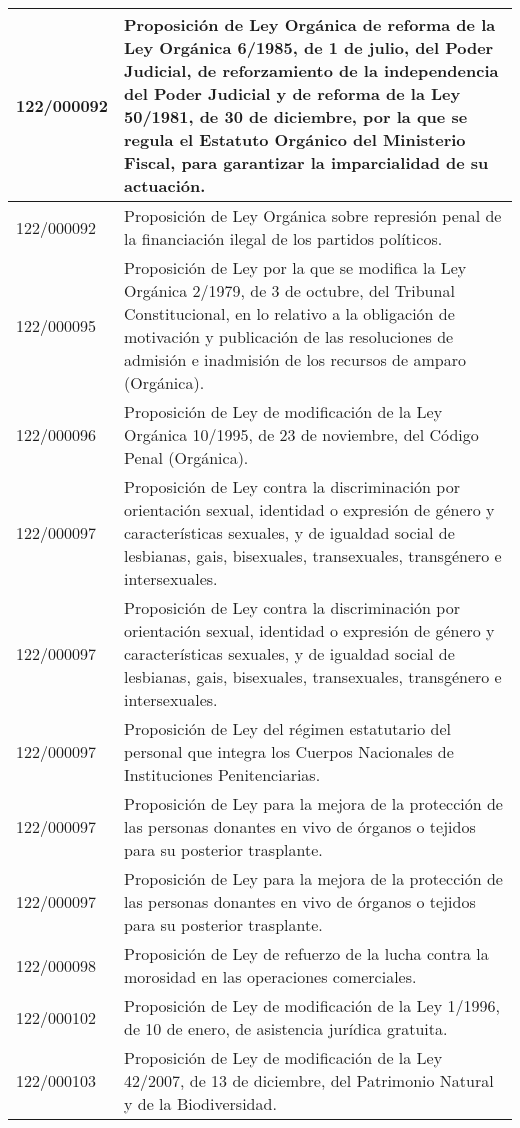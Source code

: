 {\begin{table}[H]
\begin{center}
\begin{tabularx}{\linewidth}{| l | X |}
\hline
122/000092 & Proposición de Ley Orgánica de reforma de la Ley Orgánica 6/1985, de 1 de julio, del Poder Judicial, de reforzamiento de la independencia del Poder Judicial y de reforma de la Ley 50/1981, de 30 de diciembre, por la que se regula el Estatuto Orgánico del Ministerio Fiscal, para garantizar la imparcialidad de su actuación. \\
\hline
122/000092 & Proposición de Ley Orgánica sobre represión penal de la financiación ilegal de los partidos políticos. \\
\hline
122/000095 & Proposición de Ley por la que se modifica la Ley Orgánica 2/1979, de 3 de octubre, del Tribunal Constitucional, en lo relativo a la obligación de motivación y publicación de las resoluciones de admisión e inadmisión de los recursos de amparo (Orgánica). \\
\hline
122/000096 & Proposición de Ley de modificación de la Ley Orgánica 10/1995, de 23 de noviembre, del Código Penal (Orgánica). \\
\hline
122/000097 & Proposición de Ley contra la discriminación por orientación sexual, identidad o expresión de género y características sexuales, y de igualdad social de lesbianas, gais, bisexuales, transexuales, transgénero e intersexuales. \\
\hline
122/000097 & Proposición de Ley contra la discriminación por orientación sexual, identidad o expresión de género y características sexuales, y de igualdad social de lesbianas, gais, bisexuales, transexuales, transgénero e intersexuales. \\
\hline
122/000097 & Proposición de Ley del régimen estatutario del personal que integra los Cuerpos Nacionales de Instituciones Penitenciarias. \\
\hline
122/000097 & Proposición de Ley para la mejora de la protección de las personas donantes en vivo de órganos o tejidos para su posterior trasplante. \\
\hline
122/000097 & Proposición de Ley para la mejora de la protección de las personas donantes en vivo de órganos o tejidos para su posterior trasplante. \\
\hline
122/000098 & Proposición de Ley de refuerzo de la lucha contra la morosidad en las operaciones comerciales. \\
\hline
122/000102 & Proposición de Ley de modificación de la Ley 1/1996, de 10 de enero, de asistencia jurídica gratuita. \\
\hline
122/000103 & Proposición de Ley de modificación de la Ley 42/2007, de 13 de diciembre, del Patrimonio Natural y de la Biodiversidad. \\

\end{tabularx}
\end{center}
\end{table}}
